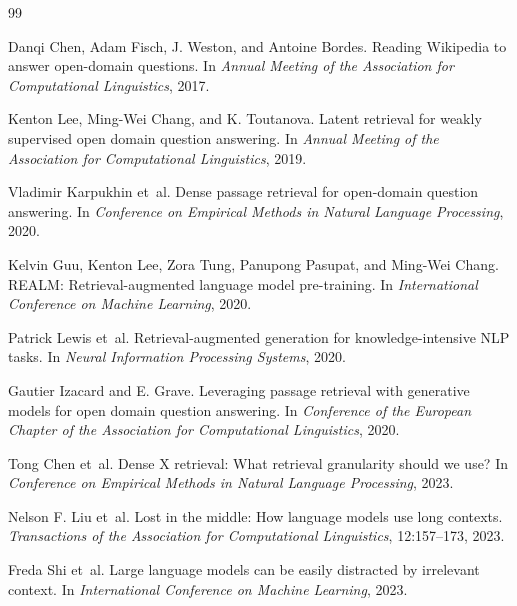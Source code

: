 \documentclass[10pt]{article}
\begin{document}
\begin{thebibliography}{99}

Danqi Chen, Adam Fisch, J. Weston, and Antoine Bordes.
\newblock Reading Wikipedia to answer open-domain questions.
\newblock In \emph{Annual Meeting of the Association for Computational Linguistics}, 2017.

Kenton Lee, Ming-Wei Chang, and K. Toutanova.
\newblock Latent retrieval for weakly supervised open domain question answering.
\newblock In \emph{Annual Meeting of the Association for Computational Linguistics}, 2019.

Vladimir Karpukhin et~al.
\newblock Dense passage retrieval for open-domain question answering.
\newblock In \emph{Conference on Empirical Methods in Natural Language Processing}, 2020.

Kelvin Guu, Kenton Lee, Zora Tung, Panupong Pasupat, and Ming-Wei Chang.
\newblock REALM: Retrieval-augmented language model pre-training.
\newblock In \emph{International Conference on Machine Learning}, 2020.

Patrick Lewis et~al.
\newblock Retrieval-augmented generation for knowledge-intensive NLP tasks.
\newblock In \emph{Neural Information Processing Systems}, 2020.

Gautier Izacard and E. Grave.
\newblock Leveraging passage retrieval with generative models for open domain question answering.
\newblock In \emph{Conference of the European Chapter of the Association for Computational Linguistics}, 2020.

Tong Chen et~al.
\newblock Dense X retrieval: What retrieval granularity should we use?
\newblock In \emph{Conference on Empirical Methods in Natural Language Processing}, 2023.

Nelson F. Liu et~al.
\newblock Lost in the middle: How language models use long contexts.
\newblock \emph{Transactions of the Association for Computational Linguistics}, 12:157--173, 2023.

Freda Shi et~al.
\newblock Large language models can be easily distracted by irrelevant context.
\newblock In \emph{International Conference on Machine Learning}, 2023.


\end{thebibliography}
\end{document}

